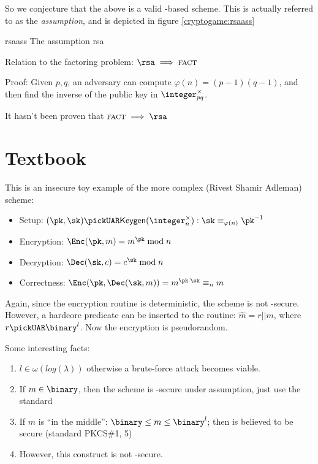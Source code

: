 So we conjecture that the above is a valid \tdp-based \pke{} scheme. This is actually referred to as the \emph{\rsa{} assumption}, and is depicted in figure \ref{cryptogame:rsaass}

\begin{cryptogame}
    {rsaass}
    {The \rsa{} assumption}
    {rsa}


    \cseqdelay


\end{cryptogame}


Relation to the factoring problem: $\rsa \implies \textsc{fact}$

Proof: Given $p, q$, an adversary can compute $\varphi(n) = (p - 1)(q - 1)$, and then find the inverse of the public key in $\integer_{pq}^\times$.

It hasn't been proven that $\textsc{fact} \implies \rsa$

\section{Textbook \rsa}

This is an insecure toy example of the more complex \rsa{} (Rivest Shamir Adleman) scheme:

\begin{itemize}
    \item Setup: $(\pk, \sk) \pickUAR \keygen(\integer_n^\times) : \sk \equiv_{\varphi(n)} \pk^{-1}$
    \item Encryption: $\Enc(\pk, m) = m^{\pk} \mod n$
    \item Decryption: $\Dec(\sk, c) = c^{\sk} \mod n$
    \item Correctness: $\Enc(\pk, \Dec(\sk, m)) = m^{\pk \cdot \sk} \equiv_n m$
\end{itemize}

Again, since the encryption routine is deterministic, the scheme is not \cpa-secure. However, a hardcore predicate can be inserted to the routine: $\hat{m} = r||m$, where $r \pickUAR \binary^l$. Now the encryption is pseudorandom.

Some interesting facts:
\begin{enumerate}
    \item $l \in \omega(log(\lambda))$ otherwise a brute-force attack becomes viable.
    \item If $m \in \binary$, then the scheme is \cpa-secure under \rsa{} assumption, just use the standard \tdp{}
    \item If $m$ is ``in the middle'': $\binary \leq m \leq \binary^l$; then \rsa{} is believed to be secure (standard PKCS\#1, 5)
    \item However, this construct is not \cca-secure.
\end{enumerate}

